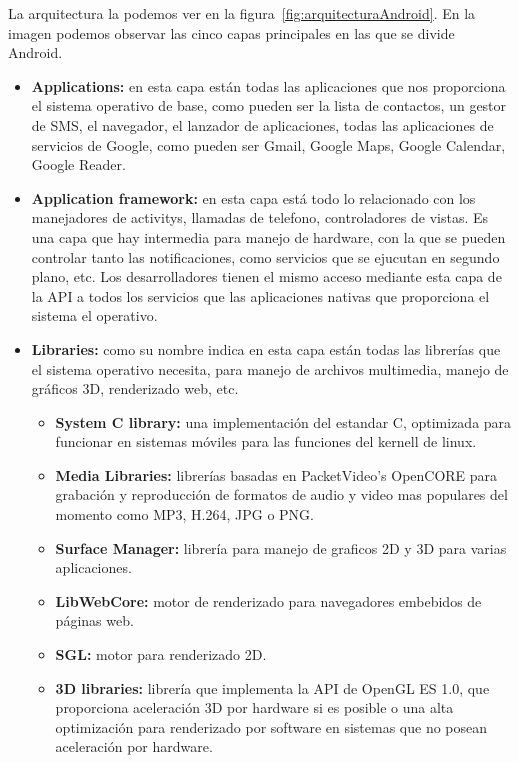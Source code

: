 La arquitectura la podemos ver en la figura~\ref{fig:arquitecturaAndroid}. En la imagen podemos observar las cinco capas principales en las que se divide Android.
\begin{itemize}

\item \textbf{Applications:} en esta capa están todas las aplicaciones que nos proporciona el sistema operativo de base, como pueden ser la lista de contactos, un gestor de SMS, el navegador, el lanzador de aplicaciones, todas las aplicaciones de servicios de Google, como pueden ser Gmail, Google Maps, Google Calendar, Google Reader.   

\item \textbf{Application framework:} en esta capa está todo lo relacionado con los manejadores de activitys, llamadas de telefono, controladores de vistas. Es una capa que hay intermedia para manejo de hardware, con la que se pueden controlar tanto las notificaciones, como servicios que se ejucutan en segundo plano, etc. Los desarrolladores tienen el mismo acceso mediante esta capa de la API a todos los servicios que las aplicaciones nativas que proporciona el sistema el operativo. 

\item \textbf{Libraries:} como su nombre indica en esta capa están todas las librerías que el sistema operativo necesita, para manejo de archivos multimedia, manejo de gráficos 3D, renderizado web, etc.

\begin{itemize}
	\item \textbf{System C library:} una implementación del estandar C, optimizada para funcionar en sistemas móviles para las funciones del kernell de linux.
	\item \textbf{Media Libraries:} librerías basadas en PacketVideo's OpenCORE para grabación y reproducción de formatos de audio y video mas populares del momento como MP3, H.264, JPG o PNG.

	\item \textbf{Surface Manager:} librería para manejo de graficos 2D y 3D para varias aplicaciones.

	\item \textbf{LibWebCore:} motor de renderizado para navegadores embebidos de páginas web.

	\item \textbf{SGL:} motor para renderizado 2D.

	\item \textbf{3D libraries:} librería que implementa la API de OpenGL ES 1.0, que proporciona aceleración 3D por hardware si es posible o una alta optimización para renderizado por software en sistemas que no posean aceleración por hardware.


\end{itemize}
\end{itemize}
